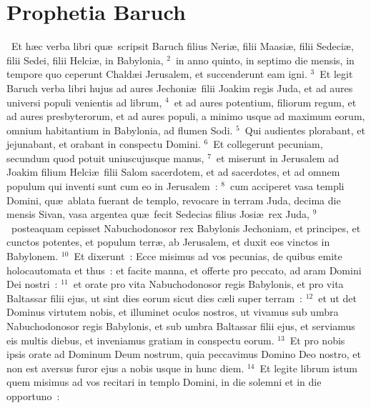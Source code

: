 {\centering \section*{Prophetia Baruch}}\thispagestyle{empty}

~Et h\ae c verba libri qu\ae\ scripsit Baruch filius Neri\ae , filii Maasi\ae , filii Sedeci\ae , filii Sedei, filii Helci\ae , in Babylonia,
${}^{2}$~in anno quinto, in septimo die mensis, in tempore quo ceperunt Chald\ae i Jerusalem, et succenderunt eam igni.
${}^{3}$~Et legit Baruch verba libri hujus ad aures Jechoni\ae\ filii Joakim regis Juda, et ad aures universi populi venientis ad librum,
${}^{4}$~et ad aures potentium, filiorum regum, et ad aures presbyterorum, et ad aures populi, a minimo usque ad maximum eorum, omnium habitantium in Babylonia, ad flumen Sodi.
${}^{5}$~Qui audientes plorabant, et jejunabant, et orabant in conspectu Domini.
${}^{6}$~Et collegerunt pecuniam, secundum quod potuit uniuscujusque manus,
${}^{7}$~et miserunt in Jerusalem ad Joakim filium Helci\ae\ filii Salom sacerdotem, et ad sacerdotes, et ad omnem populum qui inventi sunt cum eo in Jerusalem~:
${}^{8}$~cum acciperet vasa templi Domini, qu\ae\ ablata fuerant de templo, revocare in terram Juda, decima die mensis Sivan, vasa argentea qu\ae\ fecit Sedecias filius Josi\ae\ rex Juda,
${}^{9}$~posteaquam cepisset Nabuchodonosor rex Babylonis Jechoniam, et principes, et cunctos potentes, et populum terr\ae , ab Jerusalem, et duxit eos vinctos in Babylonem.
${}^{10}$~Et dixerunt~: Ecce misimus ad vos pecunias, de quibus emite holocautomata et thus~: et facite manna, et offerte pro peccato, ad aram Domini Dei nostri~:
${}^{11}$~et orate pro vita Nabuchodonosor regis Babylonis, et pro vita Baltassar filii ejus, ut sint dies eorum sicut dies c\ae li super terram~:
${}^{12}$~et ut det Dominus virtutem nobis, et illuminet oculos nostros, ut vivamus sub umbra Nabuchodonosor regis Babylonis, et sub umbra Baltassar filii ejus, et serviamus eis multis diebus, et inveniamus gratiam in conspectu eorum.
${}^{13}$~Et pro nobis ipsis orate ad Dominum Deum nostrum, quia peccavimus Domino Deo nostro, et non est aversus furor ejus a nobis usque in hunc diem.
${}^{14}$~Et legite librum istum quem misimus ad vos recitari in templo Domini, in die solemni et in die opportuno~:

